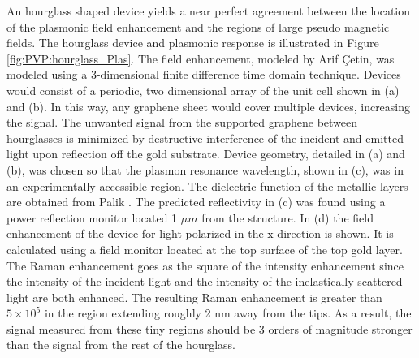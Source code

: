An hourglass shaped device yields a near perfect agreement between the location of the plasmonic field enhancement and the regions of large pseudo magnetic fields.
The hourglass device and plasmonic response is illustrated in Figure \ref{fig:PVP:hourglass_Plas}.
The field enhancement, modeled by Arif \c{C}etin, was modeled using a 3-dimensional finite difference time domain technique.
Devices would consist of a periodic, two dimensional array of the unit cell shown in (a) and (b).
In this way, any graphene sheet would cover multiple devices, increasing the signal.
The unwanted signal from the supported graphene between hourglasses is minimized by destructive interference of the incident and emitted light upon reflection off the gold substrate.
Device geometry, detailed in (a) and (b), was chosen so that the plasmon resonance wavelength, shown in (c), was in an experimentally accessible region.
The dielectric function of the metallic layers are obtained from Palik \cite{Palik1985}.
The predicted reflectivity in (c) was found using a power reflection monitor located 1 $\mu m$ from the structure.
In (d) the field enhancement of the device for light polarized in the x direction is shown.
It is calculated using a field monitor located at the top surface of the top gold layer.
The Raman enhancement goes as the square of the intensity enhancement since the intensity of the incident light and the intensity of the inelastically scattered light are both enhanced.
The resulting Raman enhancement is greater than $5 \times 10^5$ in the region extending roughly 2 nm away from the tips.
As a result, the signal measured from these tiny regions should be 3 orders of magnitude stronger than the signal from the rest of the hourglass.

